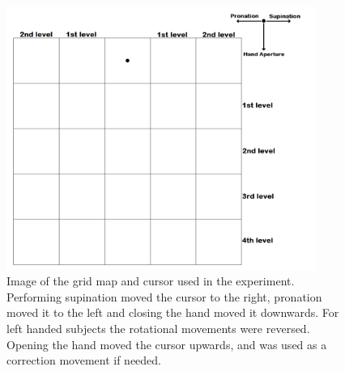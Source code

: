 \begin{figure}[H]                 
	\includegraphics[width=0.9\textwidth]{figures/gridmap2}  
	\caption{Image of the grid map and cursor used in the experiment. Performing supination moved the cursor to the right, pronation moved it to the left and closing the hand moved it downwards. For left handed subjects the rotational movements were reversed. Opening the hand moved the cursor upwards, and was used as a correction movement if needed.}
	\label{fig:meth:gridmap} 
\end{figure}

